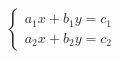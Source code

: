 \documentclass[preview]{standalone}
\begin{document}
\begin{align*}
\left\{ \begin{array}{cl} a_1x + b_1y = c_1 \\ a_2x + b_2y = c_2 \end{array} \right.
\end{align*}
\end{document}
